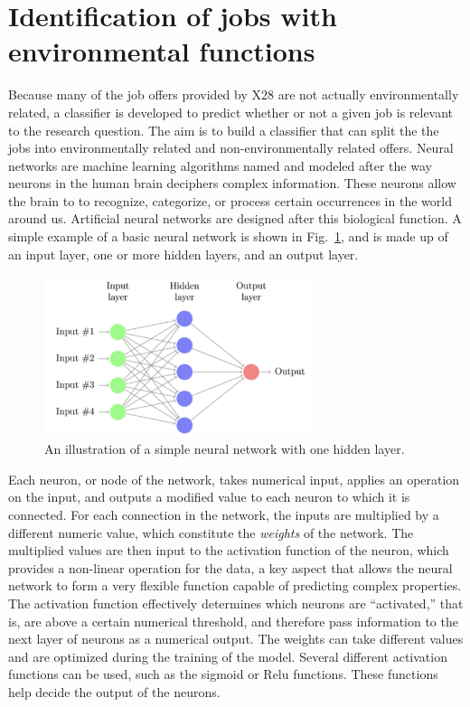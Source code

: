 \label{sec:classification}
\section{Identification of jobs with environmental functions}

Because many of the job offers provided by X28 are not actually environmentally related, a classifier is developed to predict whether or not a given job is relevant to the research question. The aim is to build a classifier that can split the the jobs into environmentally related and non-environmentally related offers. Neural networks are machine learning algorithms named and modeled after the way neurons in the human brain deciphers complex information. These neurons allow the brain to to recognize, categorize, or process certain occurrences in the world around us. Artificial neural networks are designed after this biological function. A simple example of a basic neural network is shown in Fig.~\ref{fig:basicNN}, and is made up of an input layer, one or more hidden layers, and an output layer. 

\begin{figure}[htbp]
  \centering
    \includegraphics[width=0.7\textwidth]{figures/BasicNN.pdf}
    \caption{
    An illustration of a simple neural network with one hidden layer.
    }
\label{fig:basicNN}
\end{figure}



Each neuron, or node of the network, takes numerical input, applies an operation on the input, and outputs a modified value to each neuron to which it is connected. For each connection in the network, the inputs are multiplied by a different numeric value, which constitute the \emph{weights} of the network. The multiplied values are then input to the activation function of the neuron, which provides a non-linear operation for the data, a key aspect that allows the neural network to form a very flexible function capable of predicting complex properties. The activation function effectively determines which neurons are ``activated,'' that is, are above a certain numerical threshold, and therefore pass information to the next layer of neurons as a numerical output. The weights can take different values and are optimized during the training of the model. Several different activation functions can be used, such as the sigmoid or Relu functions. These functions help decide the output of the neurons. 

